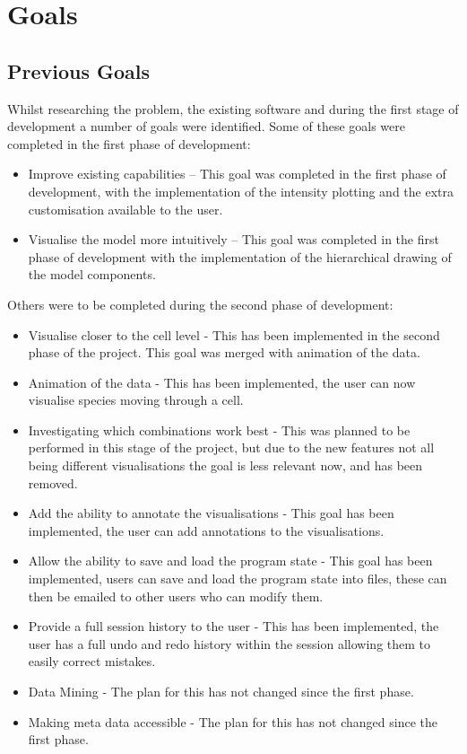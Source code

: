 \section{Goals}

\subsection{Previous Goals}
Whilst researching the problem, the existing software and during the first stage of development a number of goals were identified.  Some of these goals were completed in the first phase of development:

\begin{itemize}
\item Improve existing capabilities -- This goal was completed in the first phase of development, with the implementation of the intensity plotting and the extra customisation available to the user.
\item Visualise the model more intuitively -- This goal was completed in the first phase of development with the implementation of the hierarchical drawing of the model components.
\end{itemize}

Others were to be completed during the second phase of development:

\begin{itemize}
\item Visualise closer to the cell level - This has been implemented in the second phase of the project.  This goal was merged with animation of the data.
\item Animation of the data - This has been implemented, the user can now visualise species moving through a cell.
\item Investigating which combinations work best - This was planned to be performed in this stage of the project, but due to the new features not all being different visualisations the goal is less relevant now, and has been removed.
\item Add the ability to annotate the visualisations - This goal has been implemented, the user can add annotations to the visualisations.
\item Allow the ability to save and load the program state - This goal has been implemented, users can save and load the program state into files, these can then be emailed to other users who can modify them.
\item Provide a full session history to the user - This has been implemented, the user has a full undo and redo history within the session allowing them to easily correct mistakes.
\item Data Mining - The plan for this has not changed since the first phase.
\item Making meta data accessible - The plan for this has not changed since the first phase.
\end{itemize}

